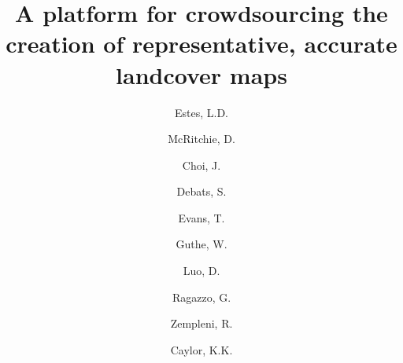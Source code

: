 \documentclass[preprint,12pt,authoryear]{elsarticle}
\begin{document}
\begin{frontmatter}



\title{A platform for crowdsourcing the creation of representative, accurate landcover maps}


\author[label1,label2]{Estes, L.D. }
\author[label3]{McRitchie, D.}
\author[label1]{Choi, J.}
\author[label1]{Debats, S.}
\author[label4]{Evans, T.}
\author[label1]{Guthe, W.}
\author[label1]{Luo, D.}
\author[label1]{Ragazzo, G.}
\author[label1]{Zempleni, R.}
\author[label1]{Caylor, K.K.}

\address[label1]{Civil and Environmental Engineering, Princeton University, Princeton, NJ, 08544 USA}
\address[label2]{Woodrow Wilson School, Princeton University, Princeton, NJ, 08544 USA}
\address[label3]{Computational Science and Engineering Support, Office of Information Technology, Princeton University, Princeton, NJ, 08544 USA}
\address[label4]{Department of Geography, Indiana University, Bloomington, IN 47405 USA}


\end{frontmatter}
\end{document}
